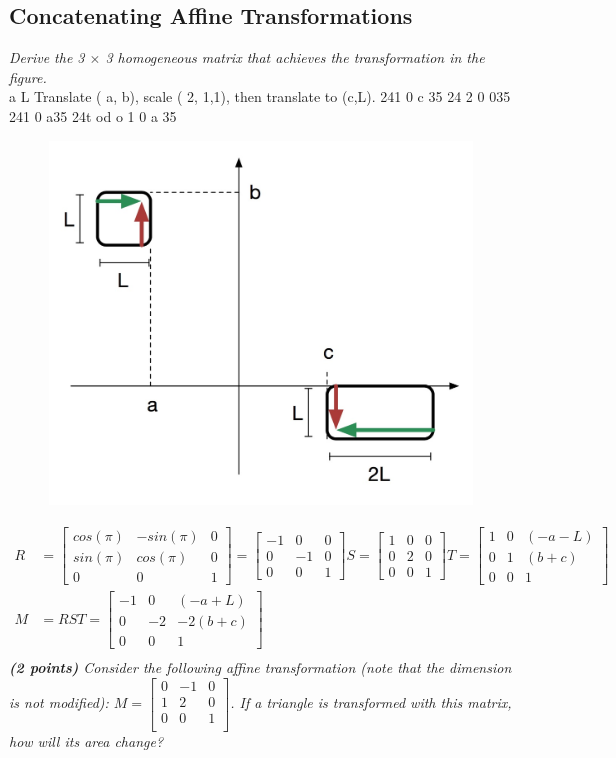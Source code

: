 \documentclass[a4paper,10pt]{article}
\begin{document}
\subsection{Concatenating Affine Transformations}
\textit{Derive the 3 $\times$ 3 homogeneous matrix that achieves the transformation in the figure.}\\
a
L
        Translate ( a, b), scale ( 2, 1,1), then translate to (c,L).
241 0 c 35 24 2 0 035 241 0  a35 24t od o   1 0 a 35
\begin{figure}[H]
	\centering
	\includegraphics[width=.2\textwidth]{2-3-transformation}
\end{figure}

\[\begin{aligned}
R&=\begin{bmatrix}
cos(\pi) & -sin(\pi) & 0\\ 
sin(\pi) & cos(\pi) & 0\\ 
0 & 0 & 1
\end{bmatrix}=\begin{bmatrix}
-1 & 0 & 0\\ 
0 & -1 & 0\\ 
0 & 0 & 1
\end{bmatrix}
S=\begin{bmatrix}
1 & 0 & 0\\ 
0 & 2 & 0\\ 
0 & 0 & 1
\end{bmatrix}
T=\begin{bmatrix}
1 & 0 & (-a-L)\\ 
0 & 1 & (b+c)\\ 
0 & 0 & 1
\end{bmatrix}\\
M&=RST=\begin{bmatrix}
-1 & 0 & (-a+L)\\ 
0 & -2 & -2(b+c)\\ 
0 & 0 & 1
\end{bmatrix}\\
\end{aligned}\]
\textit{\textbf{(2 points)} Consider the following affine transformation (note that the  dimension is not modified): $M = \begin{bmatrix}
	0&-1&0\\
	1&2&0\\
	0&0&1\\
\end{bmatrix}$. If a triangle is transformed with this matrix, how will its area change?}\\
	
\end{document}
